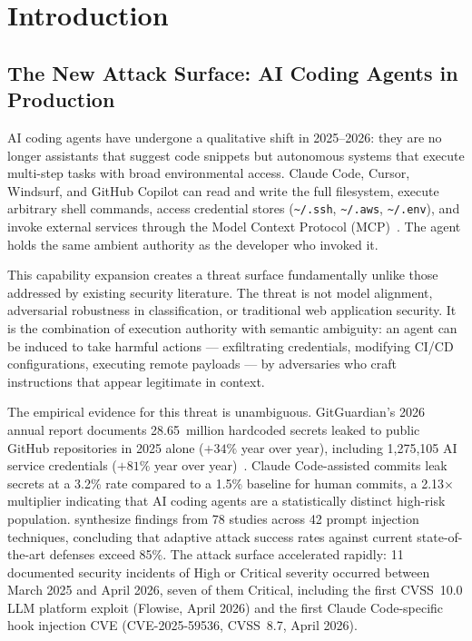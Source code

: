 \documentclass[11pt,letterpaper]{article}
\begin{document}
\tableofcontents
\clearpage

\section{Introduction}

\subsection{The New Attack Surface: AI Coding Agents in Production}

AI coding agents have undergone a qualitative shift in 2025--2026: they are no longer
assistants that suggest code snippets but autonomous systems that execute multi-step
tasks with broad environmental access. Claude Code, Cursor, Windsurf, and GitHub Copilot
can read and write the full filesystem, execute arbitrary shell commands, access
credential stores (\texttt{\textasciitilde/.ssh}, \texttt{\textasciitilde/.aws},
\texttt{\textasciitilde/.env}), and invoke external services through the Model Context
Protocol (MCP)~\citep{kim2026attack}. The agent holds the same ambient authority as the
developer who invoked it.

This capability expansion creates a threat surface fundamentally unlike those addressed
by existing security literature. The threat is not model alignment, adversarial robustness
in classification, or traditional web application security. It is the combination of
execution authority with semantic ambiguity: an agent can be induced to take harmful
actions --- exfiltrating credentials, modifying CI/CD configurations, executing remote
payloads --- by adversaries who craft instructions that appear legitimate in context.

The empirical evidence for this threat is unambiguous. GitGuardian's 2026 annual report
documents 28.65~million hardcoded secrets leaked to public GitHub repositories in 2025
alone ($+34\%$ year over year), including 1,275,105 AI service credentials ($+81\%$
year over year)~\citep{gitguardian2026state}. Claude Code-assisted commits leak secrets
at a 3.2\% rate compared to a 1.5\% baseline for human commits, a 2.13$\times$
multiplier indicating that AI coding agents are a statistically distinct high-risk
population. \citet{maloyan2026prompt} synthesize findings from 78 studies across 42
prompt injection techniques, concluding that adaptive attack success rates against
current state-of-the-art defenses exceed 85\%. The attack surface accelerated rapidly:
11 documented security incidents of High or Critical severity occurred between March 2025
and April 2026, seven of them Critical, including the first CVSS~10.0 LLM platform
exploit (Flowise, April 2026) and the first Claude Code-specific hook injection CVE
(CVE-2025-59536, CVSS~8.7, April 2026).
\end{document}
